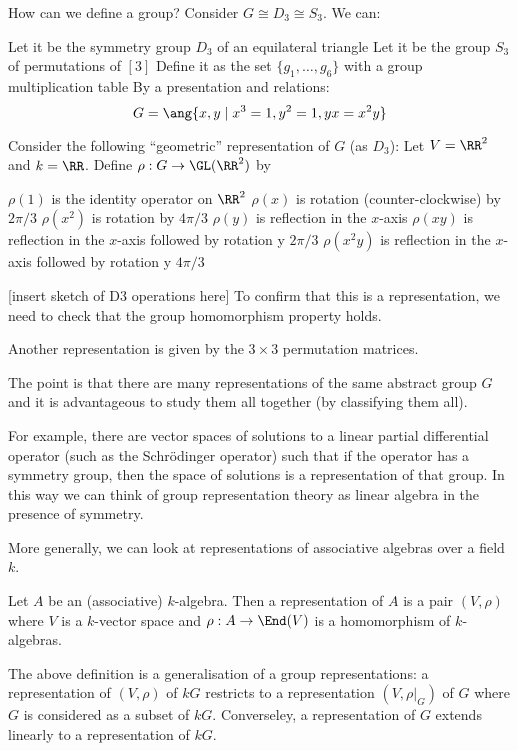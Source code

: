 \begin{exam}
	How can we define a group?
	Consider $G \cong D_3 \cong S_3$.
	We can:
	\begin{itm}
		\io Let it be the symmetry group $D_3$ of an equilateral triangle
		\io Let it be the group $S_3$ of permutations of $[3]$
		\io Define it as the set $\{g_1,\ldots,g_6\}$ with a group multiplication table
		\io By a presentation and relations:
		\[G=\ang{x,y \mid x^3=1, y^2=1, yx=x^2y}\]
	\end{itm}
	
	Consider the following ``geometric'' representation of $G$ (as $D_3$):
	Let $V=\RR^2$ and $k=\RR$.
	Define $\rho:G \to \GL(\RR^2)$ by
	\begin{itm}
		\io $\rho(1)$ is the identity operator on $\RR^2$
		\io $\rho(x)$ is rotation (counter-clockwise) by $2\pi/3$
		\io $\rho(x^2)$ is rotation by $4\pi/3$
		\io $\rho(y)$ is reflection in the $x$-axis
		\io $\rho(xy)$ is reflection in the $x$-axis followed by rotation y $2\pi/3$
		\io $\rho(x^2y)$ is reflection in the $x$-axis followed by rotation y $4\pi/3$
	\end{itm}
	[insert sketch of D3 operations here]
	To confirm that this is a representation, we need to check that the group homomorphism property holds.
	
	Another representation is given by the $3 \times 3$ permutation matrices.
	
	The point is that there are many representations of the same abstract group $G$ and it is advantageous to study them all together (by classifying them all).
	
	For example, there are vector spaces of solutions to a linear partial differential operator (such as the Schr\"odinger operator) such that if the operator has a symmetry group, then the space of solutions is a representation of that group.
	In this way we can think of group representation theory as linear algebra in the presence of symmetry.
\end{exam}

More generally, we can look at representations of associative algebras over a field $k$.

\begin{defn}
	Let $A$ be an (associative) $k$-algebra.
	Then a representation of $A$ is a pair $(V,\rho)$ where $V$ is a $k$-vector space and $\rho:A \to \End(V)$ is a homomorphism of $k$-algebras.
\end{defn}

\begin{rmk}
	The above definition is a generalisation of a group representations: a representation of $(V,\rho)$ of $kG$ restricts to a representation $(V,\rho|_G)$ of $G$ where $G$ is considered as a subset of $kG$.
	Converseley, a representation of $G$ extends linearly to a representation of $kG$.
\end{rmk}